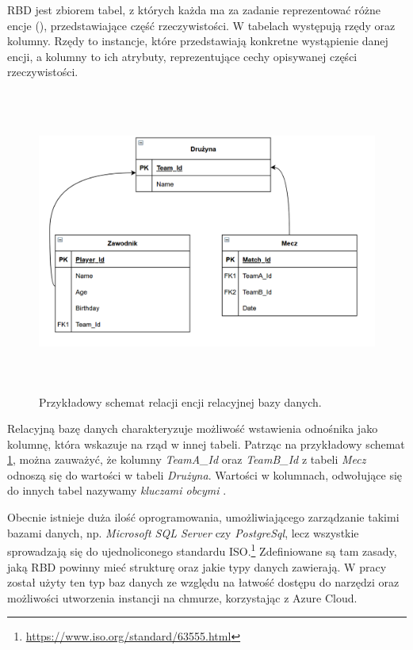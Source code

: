 RBD jest zbiorem tabel, z których każda ma za zadanie reprezentować różne encje (), przedstawiające część rzeczywistości. W tabelach występują rzędy oraz kolumny. Rzędy to instancje, które przedstawiają konkretne wystąpienie danej encji, a kolumny to ich atrybuty, reprezentujące cechy opisywanej części rzeczywistości. 

\begin{figure}[h] 
        \centering\includegraphics[width=14cm,height=10cm]{figures/Example_entities.PNG}
        \caption{Przykładowy schemat relacji encji relacyjnej bazy danych.}\label{example-Entity}
\end{figure}

Relacyjną bazę danych charakteryzuje możliwość wstawienia odnośnika jako kolumnę, która wskazuje na rząd w innej tabeli. Patrząc na przykładowy schemat \ref{example-Entity}, można zauważyć, że kolumny \textit{TeamA\_Id} oraz \textit{TeamB\_Id} z tabeli \textit{Mecz} odnoszą się do wartości w tabeli \textit{Drużyna}. Wartości w kolumnach, odwołujące się do innych tabel nazywamy \textit{kluczami obcymi} \cite{Relational_Databases_Milan}.

Obecnie istnieje duża ilość oprogramowania, umożliwiającego zarządzanie takimi bazami danych, np. \textit{Microsoft SQL Server} czy \textit{PostgreSql}, lecz wszystkie sprowadzają się do ujednoliconego standardu ISO.\footnote{\url{https://www.iso.org/standard/63555.html}} Zdefiniowane są tam zasady, jaką RBD powinny mieć strukturę oraz jakie typy danych zawierają. W pracy został użyty ten typ baz danych ze względu na łatwość dostępu do narzędzi oraz możliwości utworzenia instancji na chmurze, korzystając z Azure Cloud.

